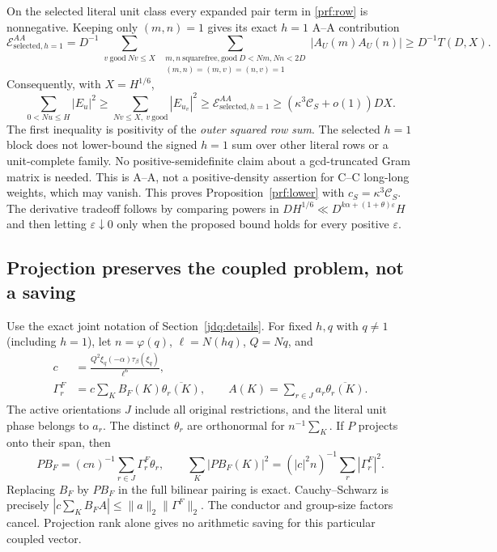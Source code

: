 \documentclass[11pt]{article}
\theoremstyle{definition}\newtheorem{definition}[theorem]{Definition}
\theoremstyle{remark}\newtheorem{remark}[theorem]{Remark}
\begin{document}
On the selected literal unit class every expanded pair term in
\eqref{prf:row} is nonnegative. Keeping only $(m,n)=1$ gives its exact
$h=1$ A--A contribution
\[
 \mathcal E^{AA}_{\mathrm{selected},h=1}
 =D^{-1}\sum_{\substack{v\ \mathrm{good}\ Nv\le X}}
  \sum_{\substack{m,n\ \mathrm{squarefree,good}\ D<Nm,Nn<2D\\
                   (m,n)=(m,v)=(n,v)=1}}|A_U(m)A_U(n)|
 \ge D^{-1}T(D,X).
\]
Consequently, with $X=H^{1/6}$,
\[
 \sum_{0<Nu\le H}|E_u|^2
 \ge\sum_{Nv\le X,\ v\ \mathrm{good}}|E_{u_v}|^2
 \ge\mathcal E^{AA}_{\mathrm{selected},h=1}
 \ge(\kappa^3\mathcal C_S+o(1))DX.
\]
The first inequality is positivity of the \emph{outer squared row sum}.
The selected $h=1$ block does not lower-bound the signed $h=1$ sum over
other literal rows or a unit-complete family. No positive-semidefinite
claim about a gcd-truncated Gram matrix is needed. This is A--A, not a
positive-density assertion for C--C long-long weights, which may vanish.
This proves Proposition~\ref{prf:lower} with $c_S=\kappa^3\mathcal C_S$.
The derivative tradeoff follows by comparing powers in
$DH^{1/6}\ll D^{k\alpha+(1+\theta)\varepsilon}H$ and then letting
$\varepsilon\downarrow0$ only when the proposed bound holds for every
positive $\varepsilon$.

\subsection{Projection preserves the coupled problem, not a saving}
Use the exact joint notation of Section~\ref{jdq:details}. For fixed
$h,q$ with $q\ne1$ (including $h=1$), let $n=\varphi(q)$, $\ell=N(hq)$, $Q=Nq$, and
\begin{align*}
 c&=\frac{Q^2\xi_q(-\alpha)\tau_\beta(\xi_q)}{\ell^6},\\
 \Gamma_r^F&=c\sum_K B_F(K)\overline{\theta_r(K)},\qquad
 A(K)=\sum_{r\in J}a_r\overline{\theta_r(K)}.
\end{align*}
The active orientations $J$ include all original restrictions, and the
literal unit phase belongs to $a_r$. The distinct $\theta_r$ are
orthonormal for $n^{-1}\sum_K$. If $P$ projects onto their span, then
\[
 PB_F=(cn)^{-1}\sum_{r\in J}\Gamma_r^F\theta_r,\qquad
 \sum_K|PB_F(K)|^2=(|c|^2n)^{-1}\sum_r|\Gamma_r^F|^2.
\]
Replacing $B_F$ by $PB_F$ in the full bilinear pairing is exact.
Cauchy--Schwarz is precisely
$|c\sum_KB_FA|\le\|a\|_2\|\Gamma^F\|_2$.
The conductor and group-size factors cancel. Projection rank alone gives
no arithmetic saving for this particular coupled vector.
\end{document}
